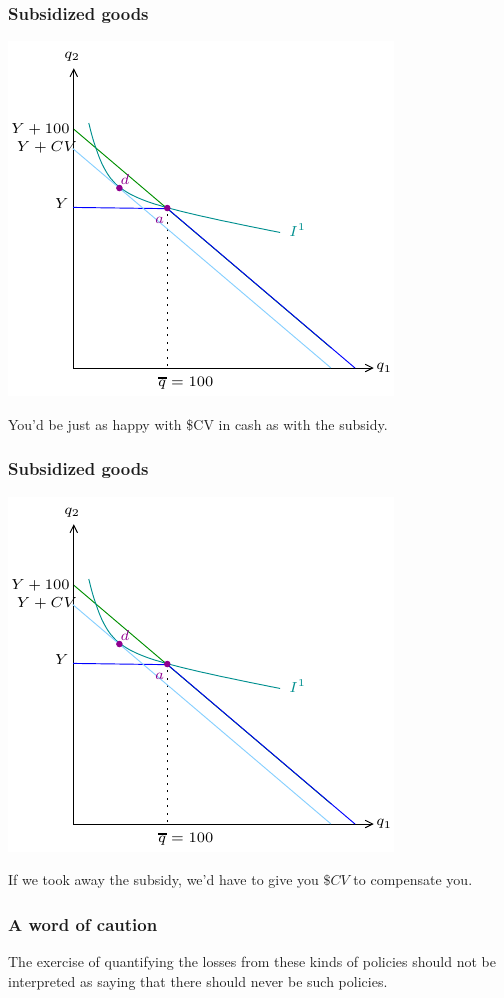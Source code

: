 \documentclass[xcolor=pdftex,dvipsnames]{beamer}
\begin{document}
\begin{frame}
\frametitle{Subsidized goods}
\begin{center}
\includegraphics{pics/Subsidy7}
\end{center}
You'd be just as happy with \$CV in cash as with the subsidy.
\end{frame}

\begin{frame}
\frametitle{Subsidized goods}
\begin{center}
\includegraphics{pics/Subsidy7}
\end{center}
If we took away the subsidy, we'd have to give you $\$CV$ to
compensate you.
\end{frame}



\begin{frame}
\frametitle{A word of caution}
The exercise of quantifying the losses from these kinds of policies
should not be interpreted as saying that there should never be such
policies.
\bigskip

\end{frame}
\end{document}
